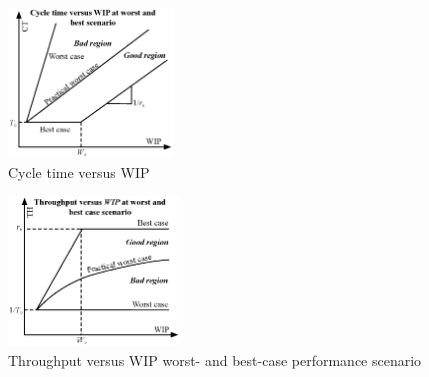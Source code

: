 \documentclass{article}
\begin{document}
\begin{figure}[htbp]
\centering
\includegraphics[height=150]{Figures/Cycle_time_versus_WIP.eps}
\caption{\label{fig:orga3ffcdc}Cycle time versus WIP}
\end{figure}


\begin{figure}[htbp]
\centering
\includegraphics[height=150]{Figures/Throughput_versus_WIP.eps}
\caption{\label{fig:orgfbaa019}Throughput versus WIP worst- and best-case performance scenario}
\end{figure}
\end{document}
